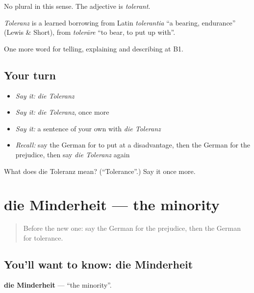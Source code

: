 No plural in this sense. The adjective is \emph{tolerant}.

\begin{cousinweb}
\emph{Toleranz} is a learned borrowing from Latin \emph{tolerantia} \textquotedblleft{}a bearing, endurance\textquotedblright{} (Lewis \& Short), from \emph{tolerāre} \textquotedblleft{}to bear, to put up with\textquotedblright{}.
\end{cousinweb}

\begin{grammarlens}[title={What you've built}]
One more word for telling, explaining and describing at B1.
\end{grammarlens}

\subsection*{Your turn}
\begin{itemize}
\raggedright
  \item \emph{Say it:} \emph{die Toleranz}
  \item \emph{Say it:} \emph{die Toleranz}, once more
  \item \emph{Say it:} a sentence of your own with \emph{die Toleranz}
  \item \emph{Recall:} say the German for to put at a disadvantage, then the German for the prejudice, then say \emph{die Toleranz} again
\end{itemize}

\begin{tcolorbox}[breakable,colback=teal!4,colframe=teal!35!black,title={Before you move on}]
What does die Toleranz mean? (\textquotedblleft{}Tolerance\textquotedblright{}.) Say it once more.
\end{tcolorbox}
\section[die Minderheit]{die Minderheit — the minority}

\label{lesson:GE-C360-minderheit}



\begin{quote}
Before the new one: say the German for the prejudice, then the German for tolerance.
\end{quote}

\subsection*{You'll want to know: die Minderheit}
\textbf{die Minderheit} — \textquotedblleft{}the minority\textquotedblright{}.

